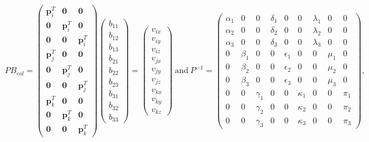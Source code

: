 \documentclass[12pt]{article}
\begin{document}
\begin{equation*}
PB_{col} = 
\begin{pmatrix}
 \mathbf{p}_i^T & \mathbf{0} & \mathbf{0} \\ 
 \mathbf{0} & \mathbf{p}_i^T & \mathbf{0}\\ 
 \mathbf{0} & \mathbf{0} & \mathbf{p}_i^T \\
  \mathbf{p}_j^T & \mathbf{0} & \mathbf{0} \\ 
 \mathbf{0} & \mathbf{p}_j^T & \mathbf{0}\\ 
 \mathbf{0} & \mathbf{0} & \mathbf{p}_j^T \\
  \mathbf{p}_k^T & \mathbf{0} & \mathbf{0} \\ 
 \mathbf{0} & \mathbf{p}_k^T & \mathbf{0}\\ 
 \mathbf{0} & \mathbf{0} & \mathbf{p}_k^T 
\end{pmatrix}
\begin{pmatrix}
b_{11} \\
b_{12} \\
b_{13} \\
b_{21} \\
b_{22} \\
b_{23} \\
b_{31} \\
b_{32} \\
b_{33}
\end{pmatrix} =
\begin{pmatrix} 
v_{ix} \\
v_{iy} \\
v_{iz} \\
v_{jx} \\
v_{jy} \\
v_{jz} \\
v_{kx} \\
v_{ky} \\
v_{kz}
\end{pmatrix} ~
\text{and} ~
P^{-1} = 
\begin{pmatrix}
\alpha_1 & 0 & 0 & \delta_1 & 0 & 0 & \lambda_1 & 0 & 0 \\
\alpha_2 & 0 & 0 & \delta_2 & 0 & 0 & \lambda_2 & 0 & 0 \\
\alpha_3 & 0 & 0 & \delta_3 & 0 & 0 & \lambda_3 & 0 & 0 \\
0 & \beta_1 & 0 & 0 & \epsilon_1 & 0 & 0 & \mu_1 & 0 \\
0 & \beta_2 & 0 & 0 & \epsilon_2 & 0 & 0 & \mu_2 & 0 \\
0 & \beta_3 & 0 & 0 & \epsilon_3 & 0 & 0 & \mu_3 & 0 \\
0 & 0 & \gamma_1 & 0 & 0 & \kappa_1 & 0 & 0 & \pi_1 \\
0 & 0 & \gamma_2 & 0 & 0 & \kappa_2 & 0 & 0 & \pi_2  \\
0 & 0 & \gamma_3 & 0 & 0 & \kappa_3 & 0 & 0 & \pi_3
\end{pmatrix},
\end{equation*}
\end{document}
